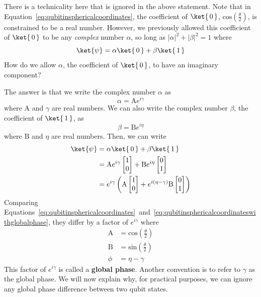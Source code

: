 \documentclass{article}
\theoremstyle{definition}
\newcommand{\abs}[1]{{\big\vert} #1 {\big\vert}}
\newcommand{\kz}[1]{\ket{\,#1\,}}
\newcommand{\mkzero}{\begin{bmatrix}1\\ 0\end{bmatrix}}
\newcommand{\mkone}{\begin{bmatrix}0\\ 1\end{bmatrix}}
\begin{document}
There is a technicality here that is ignored in the above statement.  Note that in Equation~\ref{eq:qubitinsphericalcoordinates}, the coefficient of $\kz0$, $\text{cos}\left(\frac{\theta}{2}\right)$, is constrained to be a real number.  However, we previously allowed this coefficient of $\kz0$ to be any \textit{complex} number $\alpha$, so long as $\abs{\alpha}^2 + \abs{\beta}^2 = 1$ where
\begin{equation}
	\ket{\psi} = \alpha \kz0 + \beta \kz1
\end{equation}
How do we allow $\alpha$, the coefficient of $\kz0$, to have an imaginary component?

The answer is that we write the complex number $\alpha$ as
\begin{equation}
	\alpha = \mathrm{A} e^{i \gamma}
\end{equation}
where $\mathrm{A}$ and $\gamma$ are real numbers.
We can also write the complex number $\beta$, the coefficient of $\kz1$, as
\begin{equation}
	\beta = \mathrm{B} e^{i \eta}
\end{equation}
where $\mathrm{B}$ and $\eta$ are real numbers.
Then, we can write
\begin{align}
	\ket{\psi} &= \alpha \kz0 + \beta \kz1\\
	&= \mathrm{A} e^{i \gamma} \mkzero + \mathrm{B} e^{i \eta} \mkone\\
	&= e^{i \gamma} \left( \mathrm{A} \mkzero + e^{i (\eta - \gamma)} \mathrm{B} \mkone \right)
	\label{eq:qubitinsphericalcoordinateswithglobalphase}
\end{align}
Comparing Equations~\ref{eq:qubitinsphericalcoordinates}~and~\ref{eq:qubitinsphericalcoordinateswithglobalphase}, they differ by a factor of $e^{i \gamma}$ where
\begin{align}
	\mathrm{A} &= \text{cos}\left(\frac{\theta}{2}\right)\\
	\mathrm{B} &= \text{sin}\left(\frac{\theta}{2}\right)\\
	\phi &= \eta - \gamma
\end{align}
This factor of $e^{i \gamma}$ is called a \textbf{global phase}.  Another convention is to refer to $\gamma$ as the global phase.
We will now explain why, for practical purposes, we can ignore any global phase difference between two qubit states.
\end{document}
